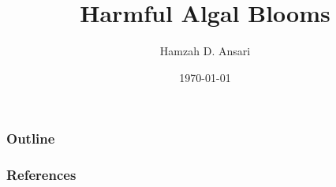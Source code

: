 \documentclass{beamer}
\title{Harmful Algal Blooms}
\author{Hamzah D. Ansari}
\institute{Oakland University}
\date{\today}
\begin{document}
\begin{frame} 
\titlepage
\end{frame}

\begin{frame}
	\frametitle{Outline}
	\tableofcontents
\end{frame}



\begin{frame}[allowframebreaks]
	\frametitle{References}
	\printbibliography
\end{frame}
\end{document}
